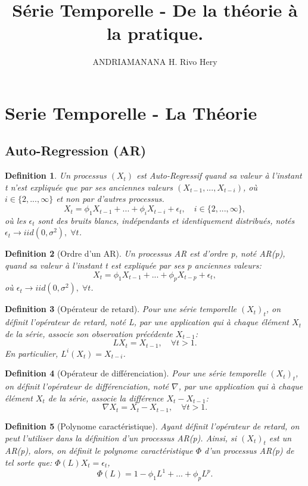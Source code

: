 \documentclass{article}
\title{Série Temporelle - De la théorie à la pratique.}
\author{ANDRIAMANANA H. Rivo Hery}
\newtheorem{definition}{Definition}[section]
\begin{document}
\maketitle

\section{Serie Temporelle - La Théorie}

\subsection{Auto-Regression (AR)}

\begin{definition}
Un processus $(X_t)$ est Auto-Regressif quand sa valeur à l'instant t n'est expliquée que par ses anciennes valeurs $(X_{t-1},...,X_{t-i})$, où $i\in\{2,...,\infty\}$ et non par d'autres processus.
$$X_t=\phi_1{X_{t-1}}+...+\phi_i{X_{t-i}}+\epsilon_t, \quad i\in\{2,...,\infty\},$$
où les $\epsilon_t$ sont des bruits blancs, indépendants et identiquement distribués, notés $\epsilon_t \rightarrow iid(0,\sigma^2), \; \forall t$.
\end{definition}

\begin{definition}[Ordre d'un AR]
Un processus AR est d'ordre p, noté AR(p), quand sa valeur à l'instant t est expliquée par ses p anciennes valeurs: 
$$X_t=\phi_1{X_{t-1}}+...+\phi_p{X_{t-p}}+\epsilon_t,$$
où $\epsilon_t \rightarrow iid(0,\sigma^2), \; \forall t$.
\end{definition}

\begin{definition}[Opérateur de retard]
Pour une série temporelle $(X_t)_t$, on définit l'opérateur de retard, noté L, par une application qui à chaque élément $X_t$ de la série, associe son observation précédente $X_{t-1}$:
$$LX_t=X_{t-1}, \quad \forall t>1.$$
En particulier, $L^i(X_t)=X_{t-i}$.
\end{definition}

\begin{definition}[Opérateur de différenciation]
Pour une série temporelle $(X_t)_t$, on définit l'opérateur de différenciation, noté $\nabla$, par une application qui à chaque élément $X_t$ de la série, associe la différence $X_t-X_{t-1}$:
$$\nabla{X_t}=X_t-X_{t-1}, \quad \forall t>1.$$
\end{definition}

\begin{definition}[Polynome caractéristique]
Ayant définit l'opérateur de retard, on peut l'utiliser dans la définition d'un processus AR(p).
\newline
Ainsi, si $(X_t)_t$ est un AR(p), alors, on définit le polynome caractéristique $\Phi$ d'un processus AR(p) de tel sorte que: $\Phi(L){X_t}=\epsilon_t$,
$$\Phi(L)=1-\phi_1{L^1}+...+\phi_p{L^p}.$$
\end{definition}
\end{document}
